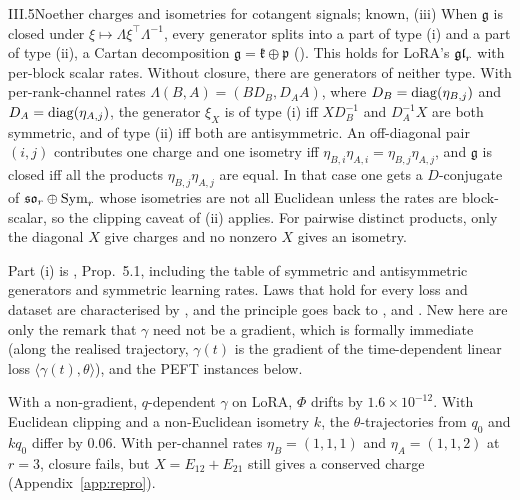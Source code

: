 \begin{theorem}{III.5}{Noether charges and isometries for cotangent signals; known, \citet{zhao2022symmetries}}
(iii) When $\mathfrak g$ is closed under $\xi\mapsto\Lambda\xi^\top\Lambda^{-1}$, every generator splits into a part of type (i) and a part of type (ii), a Cartan decomposition $\mathfrak g=\mathfrak k\oplus\mathfrak p$ (). This holds for LoRA's $\mathfrak{gl}_r$ with per-block scalar rates. Without closure, there are generators of neither type. With per-rank-channel rates $\Lambda(B,A)=(BD_B,D_AA)$, where $D_B=\operatorname{diag}(\eta_{B,j})$ and $D_A=\operatorname{diag}(\eta_{A,j})$, the generator $\xi_X$ is of type (i) iff $XD_B^{-1}$ and $D_A^{-1}X$ are both symmetric, and of type (ii) iff both are antisymmetric. An off-diagonal pair $(i,j)$ contributes one charge and one isometry iff $\eta_{B,i}\eta_{A,i}=\eta_{B,j}\eta_{A,j}$, and $\mathfrak g$ is closed iff all the products $\eta_{B,j}\eta_{A,j}$ are equal. In that case one gets a $D$-conjugate of $\mathfrak{so}_r\oplus\mathrm{Sym}_r$ whose isometries are not all Euclidean unless the rates are
block-scalar, so the clipping caveat of (ii) applies. For pairwise distinct products, only the diagonal $X$ give charges and no nonzero $X$ gives an isometry.
\end{theorem}

Part (i) is \citet{zhao2022symmetries}, Prop.~5.1, including the table of symmetric and antisymmetric generators and symmetric learning rates. Laws that hold for every loss and dataset are characterised by \citet{marcotte2023abide}, and the principle goes back to \citet{du2018algorithmic}, \citet{arora2018optimization} and \citet{kunin2020neural}. New here are only the remark that $\gamma$ need not be a gradient, which is formally immediate (along the realised trajectory, $\gamma(t)$ is the gradient of the time-dependent linear loss $\langle\gamma(t),\theta\rangle$), and the PEFT instances below.

\noindent{}\enspace With a non-gradient, $q$-dependent $\gamma$ on LoRA, $\Phi$ drifts by $1.6\times10^{-12}$. With Euclidean clipping and a non-Euclidean isometry $k$, the $\theta$-trajectories from $q_0$ and $kq_0$ differ by $0.06$. With per-channel rates $\eta_B=(1,1,1)$ and $\eta_A=(1,1,2)$ at $r=3$, closure fails, but $X=E_{12}+E_{21}$ still gives a conserved charge (Appendix~\ref{app:repro}).

